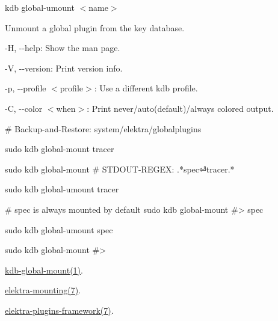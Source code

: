 {\ttfamily kdb global-\/umount $<$name$>$}

Unmount a global plugin from the key database.


\begin{DoxyItemize}
\item {\ttfamily -\/H}, {\ttfamily -\/-\/help}\+: Show the man page.
\item {\ttfamily -\/V}, {\ttfamily -\/-\/version}\+: Print version info.
\item {\ttfamily -\/p}, {\ttfamily -\/-\/profile $<$profile$>$}\+: Use a different kdb profile.
\item {\ttfamily -\/C}, {\ttfamily -\/-\/color $<$when$>$}\+: Print never/auto(default)/always colored output.
\end{DoxyItemize}


\begin{DoxyCode}
# Backup-and-Restore: system/elektra/globalplugins

sudo kdb global-mount tracer

sudo kdb global-mount
# STDOUT-REGEX: .*spec⏎tracer.*

sudo kdb global-umount tracer

# spec is always mounted by default
sudo kdb global-mount
#> spec

sudo kdb global-umount spec

sudo kdb global-mount
#>
\end{DoxyCode}



\begin{DoxyItemize}
\item \hyperlink{doc_help_kdb-global-mount_md}{kdb-\/global-\/mount(1)}.
\item \hyperlink{doc_help_elektra-mounting_md}{elektra-\/mounting(7)}.
\item \hyperlink{doc_dev_plugins-framework_md}{elektra-\/plugins-\/framework(7)}. 
\end{DoxyItemize}